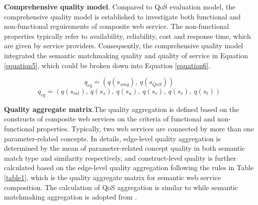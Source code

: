\documentclass{llncs}
\begin{document}
\textbf{Comprehensive quality model}. Compared to QoS evaluation model, the comprehensive quality model is established to investigate both functional and non-functional reguirements of composite web service. The non-functional properties typically refer to availability, reliability, cost and response time, which are given by service providers. Consequently, the comprehensive quality model integrated the semantic matchmaking quality and quality of service in Equation \ref{equation5}, which could be broken down into Equation \ref{equation6}.

\begin{equation}
\label{equation5}
q_{cq} \stackrel{.}{=} (q(s_ {smq}), \  q(s_ {QoS}))
\end{equation}
\begin{equation}
\label{equation6}
q_{cq} \stackrel{.}{=} (q(s_ {mt}), \  q(s_ {s}), \  q(s_{a}),\  q(s_{r}),\  q(s_{c}),\  q(s_{t}))
\end{equation}

\textbf{Quality aggregate matrix}.The quality aggregation is defined based on the constructs of composite web services on the criteria of functional and non-functional properties. Typically, two web services are connected by more than one parameter-related concepts. In details, edge-level quality aggregation is determined by the mean of parameter-related concept quality in both semantic match type and similarity respectively, and construct-level quality is further calculated based on the edge-level quality aggregation following the rules in Table \ref{table1}, which is the quality aggregate matrix for semantic web service composition. The calculation of QoS aggregation is similar to \cite{cardoso2004quality} while semantic matchmaking aggregation is adopted from \cite{lecue2009optimizing}.
\end{document}

